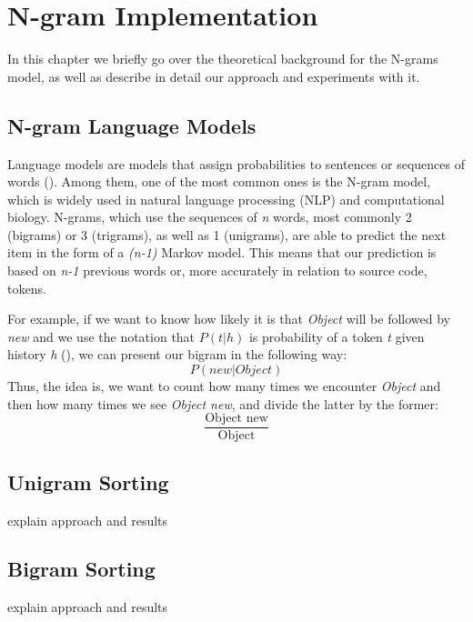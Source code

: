 \chapter{N-gram Implementation}
\label{chap:N-gram Implementation}

In this chapter we briefly go over the theoretical background for the N-grams model, as well as describe in detail our approach and experiments with it.
\section{N-gram Language Models}
Language models are models that assign probabilities to sentences or sequences of words (\cite{Jura09a}). Among them, one of the most common ones is the N-gram model, which is widely used in natural language processing (NLP) and computational biology. N-grams, which use the sequences of \textit{n} words, most commonly 2 (bigrams) or 3 (trigrams), as well as 1 (unigrams), are able to predict the next item in the form of a \textit{(n-1)} Markov model. This means that our prediction is based on \textit{n-1} previous words or, more accurately in relation to source code, tokens.

For example, if we want to know how likely it is that \textit{Object} will be followed by \textit{new} and we use the notation that $P(t|h)$ is probability of a token \textit{t} given history \textit{h} (\cite{Jura09a}), we can present our bigram in the following way:
\begin{equation}
    P(new|Object)
\end{equation}
Thus, the idea is, we want to count how many times we encounter \textit{Object} and then how many times we see \textit{Object new}, and divide the latter by the former:
\begin{equation}
    \frac{\text{Object new}}{\text{Object}}
\end{equation}

\section{Unigram Sorting}
explain approach and results

\section{Bigram Sorting}
explain approach and results